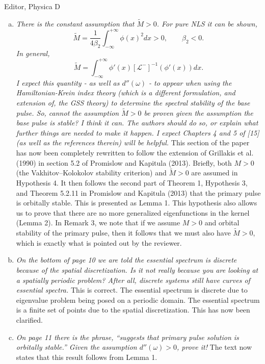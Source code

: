 \documentclass[11pt]{letter}
\begin{document}
\begin{letter}{Editor, Physica D}
\begin{enumerate}[(a)]
\item \emph{There is the constant assumption that $\tilde{M} > 0$. For pure NLS it can be shown, 
\[
\tilde{M} = \frac{1}{4 \beta_2} \int_{-\infty}^{+\infty} \phi(x)^2 dx > 0, \qquad \beta_2 < 0.
\]
In general,
\[
\tilde{M} = \int_{-\infty}^{+\infty} \phi'(x)[\mathcal{L^-}]^{-1}(\phi'(x)) dx.
\]
I expect this quantity - as well as $d''(\omega)$ - to appear when using the Hamiltonian-Krein index theory (which is a different formulation, and extension of, the GSS theory) to determine the spectral stability of the base pulse. So, cannot the assumption $\tilde{M} > 0$ be proven given the assumption the base pulse is stable? I think it can. The authors should do so, or explain what further things are needed to make it happen. I expect Chapters 4 and 5 of [15] (as well as the references therein) will be helpful.} This section of the paper has now been completely rewritten to follow the extension of Grillakis et al. (1990) in section 5.2 of Promislow and Kapitula (2013). Briefly, both $M>0$ (the Vakhitov–Kolokolov stability criterion) and $\tilde{M}>0$ are assumed in Hypothesis 4. It then follows the second part of Theorem 1, Hypothesis 3, and Theorem 5.2.11 in Promislow and Kapitula (2013) that the primary pulse is orbitally stable. This is presented as Lemma 1. This hypothesis also allows us to prove that there are no more generalized eigenfunctions in the kernel (Lemma 2). In Remark 3, we note that if we assume $M>0$ and orbital stability of the primary pulse, then it follows that we must also have $\tilde{M}>0$, which is exactly what is pointed out by the reviewer.
\vspace{4mm}

\item \emph{On the bottom of page 10 we are told the essential spectrum is discrete because of the spatial discretization. Is it not really because you are looking at a spatially periodic problem? After all, discrete systems still have curves of essential spectra.} This is correct. The essential spectrum is discrete due to eigenvalue problem being posed on a periodic domain. The essential spectrum is a finite set of points due to the spatial discretization. This has now been clarified.
\vspace{4mm}

\item \emph{On page 11 there is the phrase, ``suggests that primary pulse solution is orbitally stable.'' Given the assumption $d''(\omega) > 0$, prove it!} The text now states that this result follows from Lemma 1.
\vspace{4mm}


\end{enumerate}
\end{letter}
\end{document}
